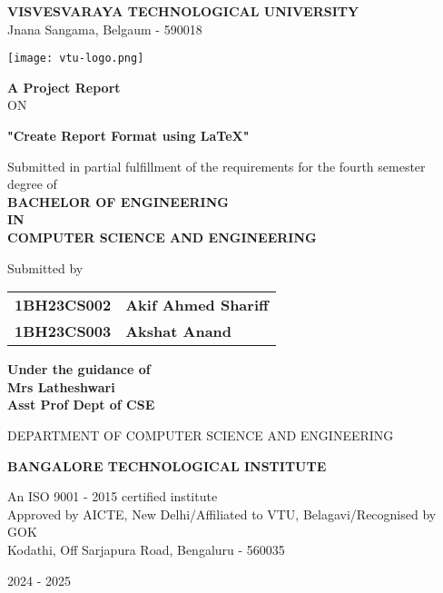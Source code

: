 \documentclass[12pt, a4paper]{report}
\begin{document}
\begin{titlepage}
\begin{center}

\textbf{{\large VISVESVARAYA TECHNOLOGICAL UNIVERSITY}}\\
{\normalsize Jnana Sangama, Belgaum - 590018}\\
\vspace{0.3in}

\texttt{[image: vtu-logo.png]}
\vspace{0.3in}

\textbf{A Project Report}\\
ON\\
\vspace{0.2in}

\textbf{{\large "Create Report Format using LaTeX"}}
\vspace{0.1in}

{\small Submitted in partial fulfillment of the requirements for the fourth semester degree of }\\
\vspace{0.2in}
\textbf{BACHELOR OF ENGINEERING\\IN\\COMPUTER SCIENCE AND ENGINEERING}\\
\vspace{0.2in}

Submitted by\\
\vspace{0.2in}

\begin{tabular}{ll}
\textbf{1BH23CS002}&\textbf{Akif Ahmed Shariff}\\
\textbf{1BH23CS003}&\textbf{Akshat Anand}\\
\end{tabular}
\vspace{0.2in}

\textbf{Under the guidance of\\Mrs Latheshwari\\Asst Prof Dept of CSE}\\
\vspace{0.2in}

{\small DEPARTMENT OF COMPUTER SCIENCE AND ENGINEERING}\\
\vspace{0.1in}

\textbf{BANGALORE TECHNOLOGICAL INSTITUTE}\\
\vspace{0.2in}

{\small An ISO 9001 - 2015 certified institute\\Approved by AICTE, New Delhi/Affiliated to VTU, Belagavi/Recognised by GOK}\\
{\large Kodathi, Off Sarjapura Road, Bengaluru - 560035}
\vspace{0.1in}

{\small 2024 - 2025}\\

\end{center}
\end{titlepage}
\end{document}
